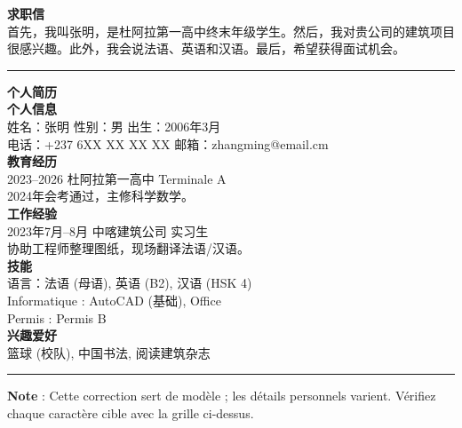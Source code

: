 \documentclass[11pt]{article}
\begin{document}
\begin{corrige}
\textbf{求职信} \\
首先，我叫张明，是杜阿拉第一高中终末年级学生。然后，我对贵公司的建筑项目很感兴趣。此外，我会说法语、英语和汉语。最后，希望获得面试机会。 \\
\noindent\rule{\linewidth}{0.4pt}\par
\textbf{个人简历} \\
\textbf{个人信息} \\
姓名：张明 \quad 性别：男 \quad 出生：2006年3月 \\
电话：+237 6XX XX XX XX \quad 邮箱：zhangming@email.cm \\
\textbf{教育经历} \\
2023--2026 \quad 杜阿拉第一高中 \quad Terminale A \\
\quad 2024年会考通过，主修科学数学。 \\
\textbf{工作经验} \\
2023年7月--8月 \quad 中喀建筑公司 \quad 实习生 \\
\quad 协助工程师整理图纸，现场翻译法语/汉语。 \\
\textbf{技能} \\
语言：法语 (母语), 英语 (B2), 汉语 (HSK 4) \\
Informatique : AutoCAD (基础), Office \\
Permis : Permis B \\
\textbf{兴趣爱好} \\
篮球 (校队), 中国书法, 阅读建筑杂志 \\
\noindent\rule{\linewidth}{0.4pt}\par
\textbf{Note} : Cette correction sert de modèle ; les détails personnels varient. Vérifiez chaque caractère cible avec la grille ci-dessus.
\end{corrige}
\end{document}
